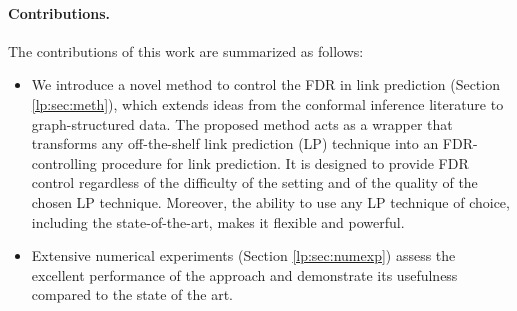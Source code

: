 \documentclass[a4paper, 11pt]{article}
\theoremstyle{remark}
\newcommand{\corange}[1]{\textcolor{orange}{#1}}
\begin{document}
\paragraph{Contributions.} The contributions of this work are summarized as follows: 

\begin{itemize}
\item We introduce a novel method to control the FDR in link prediction (Section \ref{lp:sec:meth}), which extends ideas from the conformal inference literature to graph-structured data. The proposed method acts as a wrapper that transforms any off-the-shelf link prediction (LP) technique into an FDR-controlling procedure for link prediction. It is designed to provide FDR control regardless of the difficulty of the setting and of the quality of the chosen LP technique. Moreover, the ability to use any LP technique of choice, including the state-of-the-art, makes it flexible and powerful.





\item Extensive numerical experiments \footnotemark{}  
(Section \ref{lp:sec:numexp}) assess the excellent performance of the approach and demonstrate its usefulness compared to the state of the art.
\end{itemize}
\end{document}
